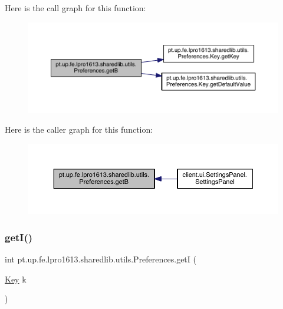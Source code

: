 Here is the call graph for this function\+:
\nopagebreak
\begin{figure}[H]
\begin{center}
\leavevmode
\includegraphics[width=350pt]{classpt_1_1up_1_1fe_1_1lpro1613_1_1sharedlib_1_1utils_1_1_preferences_ad42ac07907c3bb6066925a1de8706007_cgraph}
\end{center}
\end{figure}
Here is the caller graph for this function\+:
\nopagebreak
\begin{figure}[H]
\begin{center}
\leavevmode
\includegraphics[width=350pt]{classpt_1_1up_1_1fe_1_1lpro1613_1_1sharedlib_1_1utils_1_1_preferences_ad42ac07907c3bb6066925a1de8706007_icgraph}
\end{center}
\end{figure}
\hypertarget{classpt_1_1up_1_1fe_1_1lpro1613_1_1sharedlib_1_1utils_1_1_preferences_a6b5169368a838aca6c6880826294aea7}{}\label{classpt_1_1up_1_1fe_1_1lpro1613_1_1sharedlib_1_1utils_1_1_preferences_a6b5169368a838aca6c6880826294aea7} 
\subsubsection{\texorpdfstring{get\+I()}{getI()}}
{\footnotesize\ttfamily int pt.\+up.\+fe.\+lpro1613.\+sharedlib.\+utils.\+Preferences.\+getI (\begin{DoxyParamCaption}\item[{\hyperlink{interfacept_1_1up_1_1fe_1_1lpro1613_1_1sharedlib_1_1utils_1_1_preferences_1_1_key}{Key}}]{k }\end{DoxyParamCaption})}


